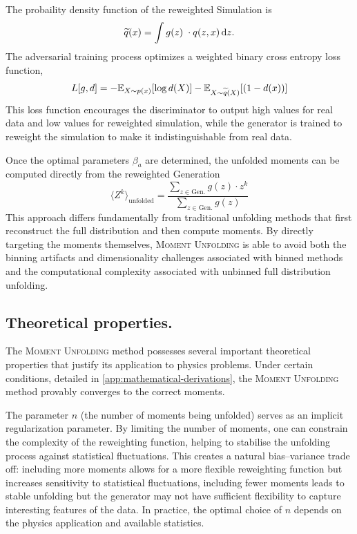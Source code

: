         The probaility density function of the reweighted Simulation is
        \[
            \widetilde{q}(x) = \int g(z)\; \cdot q(z, x) \, \dd z.
        \]
        The adversarial training process optimizes a weighted binary cross entropy loss function,
        \[
            L[g,d] = -\mathbb{E}_{X \sim p(x)}[\log d(X)] - \mathbb{E}_{X \sim\widetilde{q}(X) }[(1-d(x))]
        \]
        This loss function encourages the discriminator to output high values for real data and low values for reweighted simulation, while the generator is trained to reweight the simulation to make it indistinguishable from real data.

        Once the optimal parameters $\beta_a$ are determined, the unfolded moments can be computed directly from the reweighted Generation
        \[
            \langle Z^k \rangle_{\text{unfolded}} = \frac{\sum_{z \in \text{Gen.}} g(z) \cdot z^k}{\sum_{z \in \text{Gen.}} g(z)}
        \]
        This approach differs fundamentally from traditional unfolding methods that first reconstruct the full distribution and then compute moments.
        By directly targeting the moments themselves, \textsc{Moment Unfolding} is able to avoid both the binning artifacts and dimensionality challenges associated with binned methods and the computational complexity associated with unbinned full distribution unfolding.
    \subsection{Theoretical properties.}
        The \textsc{Moment Unfolding} method possesses several important theoretical properties that justify its application to physics problems.
        Under certain conditions, detailed in \cref{app:mathematical-derivations}, the \textsc{Moment Unfolding} method provably converges to the correct moments.

        The parameter $n$ (the number of moments being unfolded) serves as an implicit regularization parameter.
        By limiting the number of moments, one can constrain the complexity of the reweighting function, helping to stabilise the unfolding process against statistical fluctuations.
        This creates a natural bias--variance trade off: including more moments allows for a more flexible reweighting function but increases sensitivity to statistical fluctuations, including fewer moments leads to stable unfolding but the generator may not have sufficient flexibility to capture interesting features of the data.
        In practice, the optimal choice of $n$ depends on the physics application and available statistics.
        
